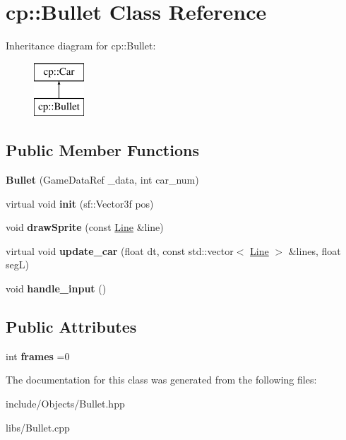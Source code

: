 \hypertarget{classcp_1_1_bullet}{}\section{cp\+:\+:Bullet Class Reference}
\label{classcp_1_1_bullet}
Inheritance diagram for cp\+:\+:Bullet\+:\begin{figure}[H]
\begin{center}
\leavevmode
\includegraphics[height=2.000000cm]{classcp_1_1_bullet}
\end{center}
\end{figure}
\subsection*{Public Member Functions}
\begin{DoxyCompactItemize}
\item 
\mbox{\label{classcp_1_1_bullet_af7953ddad292d8842e35bb194f5f725a}} 
{\bfseries Bullet} (Game\+Data\+Ref \+\_\+data, int car\+\_\+num)
\item 
\mbox{\label{classcp_1_1_bullet_ae2cf83071115590f1a547cf7d3661f81}} 
virtual void {\bfseries init} (sf\+::\+Vector3f pos)
\item 
\mbox{\label{classcp_1_1_bullet_a6ec347cc013e55f5b533cccf142de133}} 
void {\bfseries draw\+Sprite} (const \hyperlink{classcp_1_1_line}{Line} \&line)
\item 
\mbox{\label{classcp_1_1_bullet_a6710201781122f10b0451119dfc08521}} 
virtual void {\bfseries update\+\_\+car} (float dt, const std\+::vector$<$ \hyperlink{classcp_1_1_line}{Line} $>$ \&lines, float segL)
\item 
\mbox{\label{classcp_1_1_bullet_ad10ed3c00b3310951b622f0d180dbbc0}} 
void {\bfseries handle\+\_\+input} ()
\end{DoxyCompactItemize}
\subsection*{Public Attributes}
\begin{DoxyCompactItemize}
\item 
\mbox{\label{classcp_1_1_bullet_a508ef2a4895b5bd379f1cdbccbd5fab3}} 
int {\bfseries frames} =0
\end{DoxyCompactItemize}


The documentation for this class was generated from the following files\+:\begin{DoxyCompactItemize}
\item 
include/\+Objects/Bullet.\+hpp\item 
libs/Bullet.\+cpp\end{DoxyCompactItemize}
